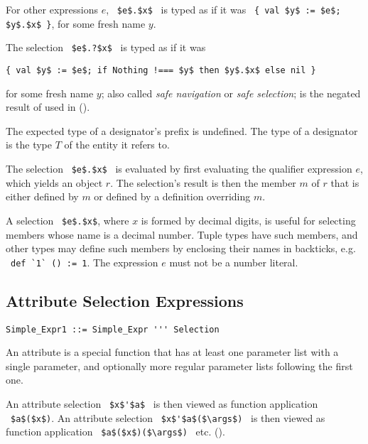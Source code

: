 For other expressions $e$, ~\lstinline!$e$.$x$!~ is typed as if it was ~\lstinline!{ val $y$ := $e$; $y$.$x$ }!, for some fresh name $y$. 

The selection ~\lstinline!$e$.?$x$!~ is typed as if it was 
\begin{lstlisting}
{ val $y$ := $e$; if Nothing !=== $y$ then $y$.$x$ else nil }
\end{lstlisting}
for some fresh name $y$; also called {\em safe navigation} or {\em safe selection}; \code{!===} is the negated result of \code{===} used in ().

The expected type of a designator's prefix is undefined. The type of a designator is the type $T$ of the entity it refers to. 

The selection ~\lstinline!$e$.$x$!~ is evaluated by first evaluating the qualifier expression $e$, which yields an object $r$. The selection's result is then the member $m$ of $r$ that is either defined by $m$ or defined by a definition overriding $m$. 

A selection ~\lstinline!$e$.$x$!, where $x$ is formed by decimal digits, is useful for selecting members whose name is a decimal number. Tuple types have such members, and other types may define such members by enclosing their names in backticks, e.g. ~\lstinline!def `1` () := 1!. The expression $e$ must not be a number literal. 





\subsection{Attribute Selection Expressions}
\label{sec:attribute-selection}

\syntax\begin{lstlisting}
Simple_Expr1 ::= Simple_Expr ''' Selection
\end{lstlisting}

An attribute is a special function that has at least one parameter list with a single parameter, and optionally more regular parameter lists following the first one. 

An attribute selection ~\lstinline!$x$'$a$!~ is then viewed as function application ~\lstinline!$a$($x$)!. An attribute selection ~\lstinline!$x$'$a$($\args$)!~ is then viewed as function application ~\lstinline!$a$($x$)($\args$)!~ etc. ().





